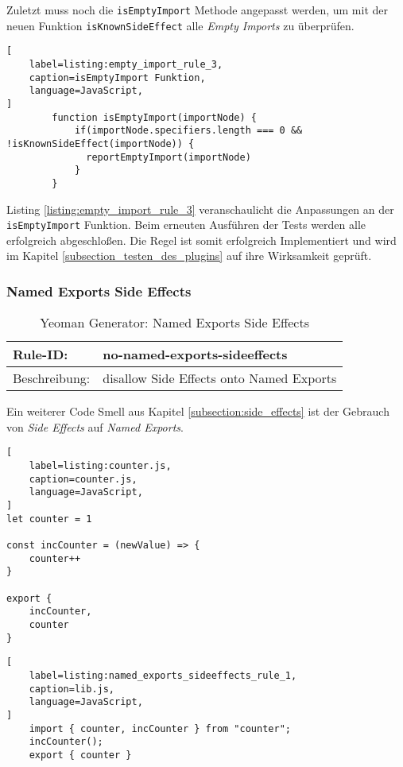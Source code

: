 Zuletzt muss noch die \lstinline{isEmptyImport} Methode angepasst werden, um mit der neuen Funktion \lstinline{isKnownSideEffect} alle \textit{Empty Imports} zu überprüfen.

\begin{lstlisting}[
    label=listing:empty_import_rule_3,
	caption=isEmptyImport Funktion,
	language=JavaScript,
]
        function isEmptyImport(importNode) {
            if(importNode.specifiers.length === 0 && !isKnownSideEffect(importNode)) {
              reportEmptyImport(importNode)
            }
        }
\end{lstlisting}

Listing \ref{listing:empty_import_rule_3} veranschaulicht die Anpassungen an der \lstinline{isEmptyImport} Funktion. Beim erneuten Ausführen der Tests werden alle erfolgreich abgeschloßen. Die Regel ist somit erfolgreich Implementiert und wird im Kapitel \ref{subsection_testen_des_plugins} auf ihre Wirksamkeit geprüft.

\subsubsection{Named Exports Side Effects}

\begin{table}[H]
\centering
\caption{Yeoman Generator: Named Exports Side Effects}
\label{tbl:named_exports}
\begin{tabular}{|l|l|}
\hline
Rule-ID: & no-named-exports-sideeffects \\ \hline
Beschreibung: & disallow Side Effects onto Named Exports \\ \hline
\end{tabular}
\end{table}

Ein weiterer Code Smell aus Kapitel \ref{subsection:side_effects} ist der Gebrauch von \textit{Side Effects }auf \textit{Named Exports}.

\begin{lstlisting}[
    label=listing:counter.js,
	caption=counter.js,
	language=JavaScript,
]
let counter = 1

const incCounter = (newValue) => {
	counter++
}

export {
	incCounter,
	counter
}
\end{lstlisting}

\begin{lstlisting}[
    label=listing:named_exports_sideeffects_rule_1,
	caption=lib.js,
	language=JavaScript,
]
	import { counter, incCounter } from "counter";
	incCounter();
	export { counter }
\end{lstlisting}

